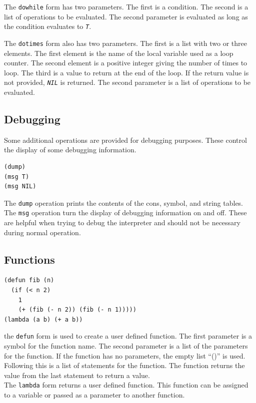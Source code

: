 \documentclass[10pt, openany]{book}
\newcommand{\function}[1]{\texttt{#1}}
\newcommand{\constant}[1]{\emph{\texttt{#1}}}
\begin{document}
The \function{dowhile} form has two parameters.  The first is a condition.  The second is a list of operations to be evaluated.  The second parameter is evaluated as long as the condition evaluates to \constant{T}.

The \function{dotimes} form also has two parameters.  The first is a list with two or three elements.  The first element is the name of the local variable used as a loop counter.  The second element is a positive integer giving the number of times to loop.  The third is a value to return at the end of the loop.  If the return value is not provided, \constant{NIL} is returned.  The second parameter is a list of operations to be evaluated.

\subsection{Debugging}
Some additional operations are provided for debugging purposes.  These control the display of some debugging information.

\begin{lstlisting}
(dump)
(msg T)
(msg NIL)
\end{lstlisting}

The \function{dump} operation prints the contents of the cons, symbol, and string tables.  The \function{msg} operation turn the display of debugging information on and off.  These are helpful when trying to debug the interpreter and should not be necessary during normal operation.

\subsection{Functions}
\begin{lstlisting}
(defun fib (n)
  (if (< n 2)
    1
    (+ (fib (- n 2)) (fib (- n 1)))))
(lambda (a b) (+ a b))
\end{lstlisting}

the \function{defun} form is used to create a user defined function.  The first parameter is a symbol for the function name.  The second parameter is a list of the parameters for the function.  If the function has no parameters, the empty list ``()'' is used.  Following this is a list of statements for the function.  The function returns the value from the last statement to return a value.\\

The \function{lambda} form returns a user defined function.  This function can be assigned to a variable or passed as a parameter to another function.
\end{document}

